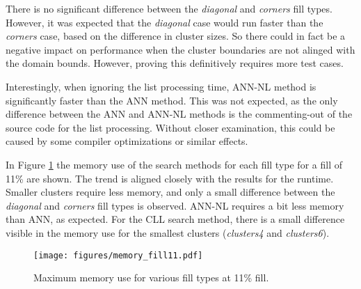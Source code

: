 There is no significant difference between the {\itshape diagonal} and {\itshape corners} fill types. However, it was expected that the {\itshape diagonal} case would run faster than the {\itshape corners} case, based on the difference in cluster sizes. So there could in fact be a negative impact on performance when the cluster boundaries are not alinged with the domain bounds. However, proving this definitively requires more test cases.

Interestingly, when ignoring the list processing time, ANN-NL method is significantly faster than the ANN method. This was not expected, as the only difference between the ANN and ANN-NL methods is the commenting-out of the source code for the list processing. Without closer examination, this could be caused by some compiler optimizations or similar effects.

In Figure \ref{FIG:memoryfill11} the memory use of the search methods for each fill type for a fill of 11\% are shown. The trend is aligned closely with the results for the runtime. Smaller clusters require less memory, and only a small difference between the {\itshape diagonal} and {\itshape corners} fill types is observed. ANN-NL requires a bit less memory than ANN, as expected. For the CLL search method, there is a small difference visible in the memory use for the smallest clusters ({\itshape clusters4} and {\itshape clusters6}). 

\begin{figure}[h]
	\centering
	\texttt{[image: figures/memory\_fill11.pdf]}
	\caption{Maximum memory use for various fill types at 11\% fill.}
	\label{FIG:memoryfill11}
\end{figure}

\begin{table}[htbp]
	\centering
	\renewcommand{\arraystretch}{1.3} %
	
	\label{TABLE:RESULTS}
\end{table}

